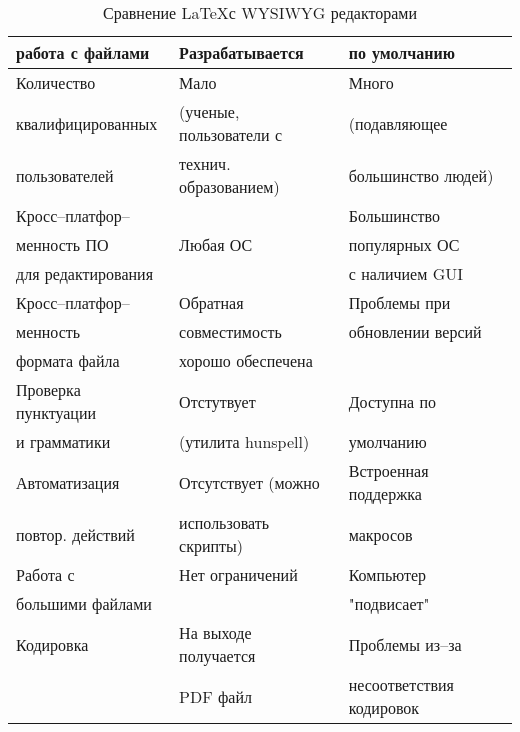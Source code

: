\begin{table}
\begin{tabular}{|l|l|l|}
работа с файлами&Разрабатывается&  по умолчанию\\
\hline
Количество & Мало&Много \\
квалифицированных&(ученые, пользователи с& (подавляющее \\
пользователей&технич. образованием)& большинство людей) \\
\hline
Кросс--платфор--& & Большинство \\
менность ПО&Любая ОС & популярных ОС  \\
 для редактирования & &  с наличием GUI \\
\hline
Кросс--платфор--&Обратная &Проблемы при \\
менность&совместимость & обновлении версий \\
формата файла &хорошо обеспечена & \\
\hline
Проверка пунктуации&Отстутвует&Доступна по\\
и грамматики&(утилита hunspell)&умолчанию \\
\hline
Автоматизация&Отсутствует (можно& Встроенная поддержка  \\
повтор. действий &использовать скрипты) & макросов \\
\hline
Работа с & Нет ограничений&Компьютер  \\
большими файлами& & "подвисает" \\
\hline
Кодировка& На выходе получается& Проблемы из--за \\
 &PDF файл& несоответствия кодировок \\
\hline
\end{tabular}
\caption{Сравнение \LaTeX с WYSIWYG редакторами}
\end{table}

